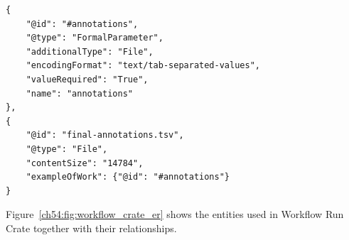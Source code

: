 \begin{listing}
\begin{verbatim}
{
    "@id": "#annotations",
    "@type": "FormalParameter",
    "additionalType": "File",
    "encodingFormat": "text/tab-separated-values",
    "valueRequired": "True",
    "name": "annotations"
},
{
    "@id": "final-annotations.tsv",
    "@type": "File",
    "contentSize": "14784",
    "exampleOfWork": {"@id": "#annotations"}
}
\end{verbatim}
\caption[Relating an actual value to its formal parameter definition]{{\bf Relating an actual value to its formal parameter definition.} The Bioschemas \href{https://bioschemas.org/profiles/FormalParameter/1.0-RELEASE}{\emph{FormalParameter}}\footnotemark\  entity \texttt{\#annotations} defines possible values for a workflow paramater named \texttt{annotations}. \texttt{\#final-annotations.tsv}, a downloadable \emph{File}, is an \texttt{exampleOfWork} in the sense that it realises the parameter definition.  It is also possible to flag particular values as representative exemplar values with the reverse \texttt{workExample} property from the \emph{FormalParameter}, which is not the case here. }
\label{ch54:formalparameter}
\end{listing}


Figure~\vref{ch54:fig:workflow_crate_er} shows the entities used in Workflow Run Crate together with their relationships.

